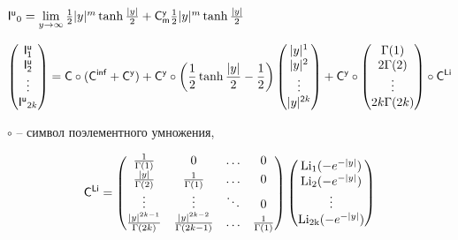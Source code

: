\documentclass[a4paper,12pt]{article}
\begin{document}
\begin{center}
    $\mathsf{I^u}_0 = \lim\limits_{y\rightarrow \infty} {1\over{2}}|y|^m \operatorname{tanh}{|y|\over{2}} + \mathsf{C_m^{y}}  {1\over{2}}|y|^m \operatorname{tanh}{|y|\over{2}}$
\end{center}

\begin{displaymath}
    \begin{pmatrix}
        \mathsf{I^u_1} \\ \mathsf{I^u_2} \\ \vdots \\ \mathsf{I^u}_{\mathsf{2}k} \\
    \end{pmatrix} = \mathsf{C} \circ (\mathsf{C^{inf}} + \mathsf{C^y}) + \mathsf{C^y} \circ \left({1\over{2}}\operatorname{tanh}{|y|\over{2}} - {1\over{2}}\right) \begin{pmatrix}
        |y|^1 \\ |y|^2 \\ \vdots \\ |y|^{\mathsf{2}k} \\
    \end{pmatrix} + \mathsf{C^y} \circ \begin{pmatrix}
        \Gamma(1) \\ 2\Gamma(2) \\ \vdots \\ 2k\Gamma(2k) \\
    \end{pmatrix} \circ \mathsf{C^{Li}} 
\end{displaymath}

 $\circ$ – символ поэлементного умножения,

\begin{displaymath}
    \mathsf{C^{Li}} =
    \begin{pmatrix}
        1\over{\Gamma(1)} & 0 & \ldots & 0 \\
        |y|\over{\Gamma(2)} & 1\over{\Gamma(1)} & \ldots & 0 \\
        \vdots & \vdots & \ddots & 0 \\
        |y|^{2k - 1}\over{\Gamma(2k)} & |y|^{2k - 2}\over{\Gamma(2k - 1)} & \ldots & 1\over{\Gamma(1)} \\
    \end{pmatrix} \begin{pmatrix}
        \operatorname{Li_1}(-e^{-|y|}) \\ \operatorname{Li_2}(-e^{-|y|}) \\ \vdots \\ \operatorname{Li_{2k}}(-e^{-|y|}) \\
    \end{pmatrix} 
\end{displaymath}
\end{document}
